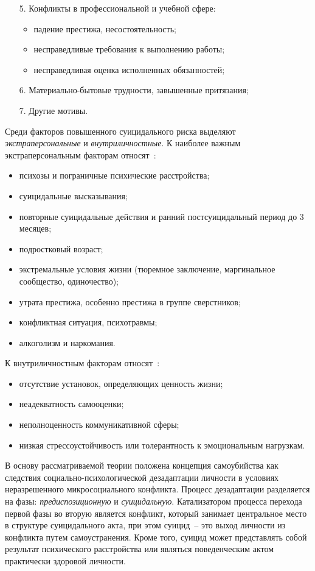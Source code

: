 \begin{enumerate}
	\item[5.] Конфликты в профессиональной и учебной сфере:
	\begin{itemize}
		\item падение престижа, несостоятельность;
		\item несправедливые требования к выполнению работы;
		\item несправедливая оценка исполненных обязанностей;
	\end{itemize}

	\item[6.] Материально-бытовые трудности, завышенные притязания;

	\item[7.] Другие мотивы.
\end{enumerate}

Среди факторов повышенного суицидального риска выделяют \textit{экстраперсональные} и \textit{внутриличностные}. К наиболее важным экстраперсональным факторам относят~\cite{ticho}:

\begin{itemize}
	\item психозы и пограничные психические расстройства;
	\item суицидальные высказывания;
	\item повторные суицидальные действия и ранний постсуицидальный период до 3 месяцев;
	\item подростковый возраст;
	\item экстремальные условия жизни (тюремное заключение, маргинальное сообщество, одиночество);
	\item утрата престижа, особенно престижа в группе сверстников;
	\item конфликтная ситуация, психотравмы;
	\item алкоголизм и наркомания.
\end{itemize}

К внутриличностным факторам относят~\cite{ticho}:

\begin{itemize}
	\item отсутствие установок, определяющих ценность жизни;
	\item неадекватность самооценки;
	\item неполноценность коммуникативной сферы;
	\item низкая стрессоустойчивость или толерантность к эмоциональным нагрузкам.
\end{itemize}

В основу рассматриваемой теории положена концепция самоубийства как следствия социально-психологической дезадаптации личности в условиях неразрешенного микросоциального конфликта. Процесс дезадаптации разделяется на фазы: \textit{предиспозиционную} и \textit{суицидальную}. Катализатором процесса перехода первой фазы во вторую является конфликт, который занимает центральное место в структуре суицидального акта, при этом суицид~-- это выход личности из конфликта путем самоустранения. Кроме того, суицид может представлять собой результат психического расстройства или являться поведенческим актом практически здоровой личности.~\cite{starsen}


